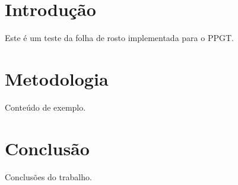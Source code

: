 \documentclass[mestrado]{UnB-PPGT}
\begin{document}
\maketitle

\textual

\chapter{Introdução}
Este é um teste da folha de rosto implementada para o PPGT.

\chapter{Metodologia}
Conteúdo de exemplo.

\chapter{Conclusão}
Conclusões do trabalho.
\end{document}
